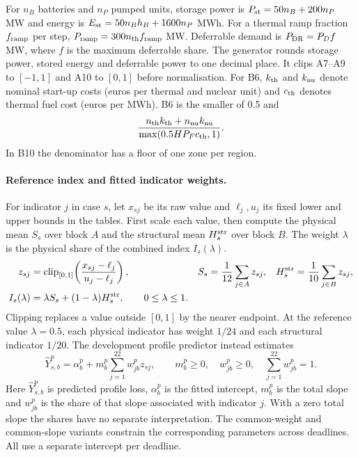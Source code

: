 \documentclass[11pt,a4paper]{article}
\newcommand{\clip}{\operatorname{clip}}
\begin{document}
For \(n_B\) batteries and \(n_P\) pumped units, storage power is \(P_{\rm st}=50n_B+200n_P\) MW and energy is \(E_{\rm st}=50n_Bh_B+1600n_P\) MWh. For a thermal ramp fraction \(f_{\rm ramp}\) per step, \(P_{\rm ramp}=300n_{\rm th}f_{\rm ramp}\) MW. Deferrable demand is \(P_{\rm DR}=P_D f\) MW, where \(f\) is the maximum deferrable share. The generator rounds storage power, stored energy and deferrable power to one decimal place. It clips A7--A9 to \([-1,1]\) and A10 to \([0,1]\) before normalisation. For B6, \(k_{\rm th}\) and \(k_{\rm nu}\) denote nominal start-up costs (euros per thermal and nuclear unit) and \(c_{\rm th}\) denotes thermal fuel cost (euros per MWh). B6 is the smaller of 0.5 and
\[
 \frac{n_{\rm th}k_{\rm th}+n_{\rm nu}k_{\rm nu}}{\max(0.5HP_Fc_{\rm th},1)}.
\]
In B10 the denominator has a floor of one zone per region.

\paragraph{Reference index and fitted indicator weights.}
For indicator \(j\) in case \(s\), let \(x_{sj}\) be its raw value and \(\ell_j,u_j\) its fixed lower and upper bounds in the tables. First scale each value, then compute the physical mean \(S_s\) over block \(A\) and the structural mean \(H_s^{\rm str}\) over block \(B\). The weight \(\lambda\) is the physical share of the combined index \(I_s(\lambda)\).
\begin{align}
 z_{sj}&=\clip_{[0,1]}\!\left(\frac{x_{sj}-\ell_j}{u_j-\ell_j}\right), &
 S_s&=\frac{1}{12}\sum_{j\in A}z_{sj}, &
 H_s^{\rm str}&=\frac{1}{10}\sum_{j\in B}z_{sj},\nonumber\\
 I_s(\lambda)&=\lambda S_s+(1-\lambda)H_s^{\rm str},\qquad 0\leq\lambda\leq1 .
 \label{eq:index}
\end{align}
Clipping replaces a value outside \([0,1]\) by the nearer endpoint. At the reference value \(\lambda=0.5\), each physical indicator has weight \(1/24\) and each structural indicator \(1/20\). The development profile predictor instead estimates
\begin{equation}
 \widehat Y_{s,b}^p=\alpha_b^p+m_b^p\sum_{j=1}^{22}w_{jb}^p z_{sj},
 \qquad m_b^p\geq0,\quad w_{jb}^p\geq0,\quad \sum_{j=1}^{22}w_{jb}^p=1.
 \label{eq:learned}
\end{equation}
Here \(\widehat Y_{s,b}^p\) is predicted profile loss, \(\alpha_b^p\) is the fitted intercept, \(m_b^p\) is the total slope and \(w_{jb}^p\) is the share of that slope associated with indicator \(j\). With a zero total slope the shares have no separate interpretation. The common-weight and common-slope variants constrain the corresponding parameters across deadlines. All use a separate intercept per deadline.
\end{document}
